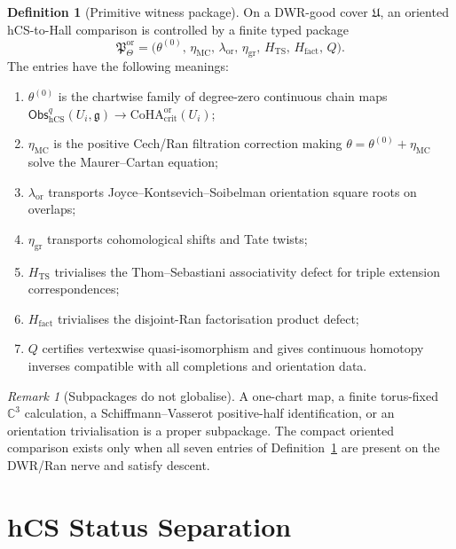 \documentclass[11pt]{amsart}
\theoremstyle{plain}
\theoremstyle{definition}
\newtheorem{definition}[theorem]{Definition}
\theoremstyle{remark}
\newtheorem{remark}[theorem]{Remark}
\providecommand{\C}{\mathbb{C}}
\providecommand{\CoHA}{\mathrm{CoHA}}
\providecommand{\Obs}{\mathsf{Obs}}
\providecommand{\hCS}{\mathrm{hCS}}
\begin{document}
\begin{definition}[Primitive witness package]
\label{def:primitive-witness-package}
On a DWR-good cover $\mathfrak U$, an oriented hCS-to-Hall comparison is
controlled by a finite typed package
\[
 \mathfrak P_{\Theta}^{\mathrm{or}}
 =
 \bigl(
 \theta^{(0)},\,
 \eta_{\mathrm{MC}},\,
 \lambda_{\mathrm{or}},\,
 \eta_{\mathrm{gr}},\,
 H_{\mathrm{TS}},\,
 H_{\mathrm{fact}},\,
 Q
 \bigr).
\]
The entries have the following meanings:
\begin{enumerate}[leftmargin=2.2em]
\item $\theta^{(0)}$ is the chartwise family of degree-zero continuous
chain maps
$\Obs^q_{\hCS}(U_i,\mathfrak g)\to
\CoHA_{\mathrm{crit}}^{\mathrm{or}}(U_i)$;
\item $\eta_{\mathrm{MC}}$ is the positive Cech/Ran filtration correction
making $\theta=\theta^{(0)}+\eta_{\mathrm{MC}}$ solve the
Maurer--Cartan equation;
\item $\lambda_{\mathrm{or}}$ transports Joyce--Kontsevich--Soibelman
orientation square roots on overlaps;
\item $\eta_{\mathrm{gr}}$ transports cohomological shifts and Tate
twists;
\item $H_{\mathrm{TS}}$ trivialises the Thom--Sebastiani associativity
defect for triple extension correspondences;
\item $H_{\mathrm{fact}}$ trivialises the disjoint-Ran factorisation
product defect;
\item $Q$ certifies vertexwise quasi-isomorphism and gives continuous
homotopy inverses compatible with all completions and orientation data.
\end{enumerate}
\end{definition}

\begin{remark}[Subpackages do not globalise]
\label{rem:subpackages}
A one-chart map, a finite torus-fixed $\C^3$ calculation, a
Schiffmann--Vasserot positive-half identification, or an orientation
trivialisation is a proper subpackage.  The compact oriented comparison
exists only when all seven entries of
Definition~\ref{def:primitive-witness-package} are present on the
DWR/Ran nerve and satisfy descent.
\end{remark}

\section{hCS Status Separation}
\label{sec:hcs-status-separation}
\end{document}
